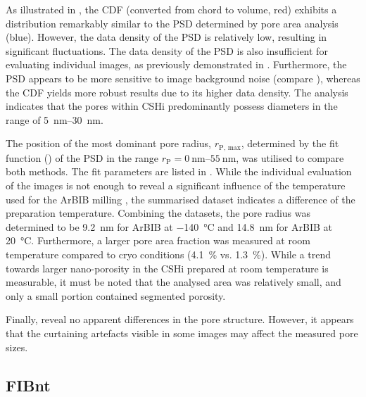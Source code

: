As illustrated in , the \ac{CDF} (converted from chord to volume, red) exhibits a distribution remarkably similar to the \ac{PSD} determined by pore area analysis (blue).
However, the data density of the \ac{PSD} is relatively low, resulting in significant fluctuations.
The data density of the \ac{PSD} is also insufficient for evaluating individual images, as previously demonstrated in \cite{kleiner.2021a}.
Furthermore, the \ac{PSD} appears to be more sensitive to image background noise (compare ), whereas the \ac{CDF} yields more robust results due to its higher data density.
The analysis indicates that the pores within \ac{CSHi} predominantly possess diameters in the range of \qtyrange{5}{30}{\nano\meter}.

The position of the most dominant pore radius, $r_\text{P, max}$, determined by the fit function () of the \ac{PSD} in the range $r_\text{P}=\qtyrange{0}{55}{\nano\meter}$, was utilised to compare both methods.
The fit parameters are listed in .
While the individual evaluation of the images is not enough to reveal a significant influence of the temperature used for the \ac{ArBIB} milling \cite{kleiner.2021a}, the summarised dataset indicates a difference of the preparation temperature.
Combining the datasets, the pore radius was determined to be \qty{9.2}{\nano\meter} for \ac{ArBIB} at \qty{-140}{\celsius} and \qty{14.8}{\nano\meter} for \ac{ArBIB} at \qty{20}{\celsius}.
Furthermore, a larger pore area fraction was measured at room temperature compared to cryo conditions (\qty{4.1}{\percent} vs. \qty{1.3}{\percent}).
While a trend towards larger nano-porosity in the \ac{CSHi} prepared at room temperature is measurable, it must be noted that the analysed area was relatively small, and only a small portion contained segmented porosity.

Finally,  reveal no apparent differences in the pore structure.
However, it appears that the curtaining artefacts visible in some images may affect the measured pore sizes.



\subsection{\acs*{FIBnt}}

